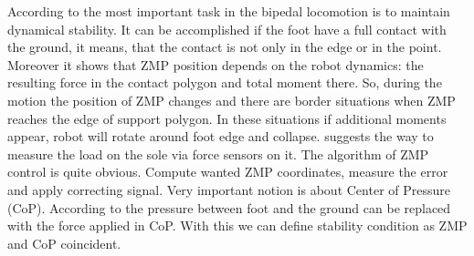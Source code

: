 \documentclass[11pt,a4paper]{article}
\begin{document}
According to \cite{zmp_vuko} the most important task in the bipedal locomotion is to maintain dynamical stability. It can be accomplished if the foot have a full contact with the ground, it means, that the contact is not only in the edge or in the point. Moreover it shows that ZMP position depends on the robot dynamics: the resulting force in the contact polygon and total moment there. So, during the motion the position of ZMP changes and there are border situations when ZMP reaches the edge of support polygon. In these situations if additional moments appear, robot will rotate around foot edge and collapse. \cite{zmp_vuko} suggests the way to measure the load on the sole via force sensors on it. The algorithm of ZMP control is quite obvious. Compute wanted ZMP coordinates, measure the error and apply correcting signal. Very important notion is about Center of Pressure (CoP). According to \cite{zmp_vuko} the pressure between foot and the ground can be replaced with the force applied in CoP. With this we can define stability condition as ZMP and CoP coincident.

\newpage

\begin{thebibliography}{2}
\end{thebibliography}


  
\end{document}
